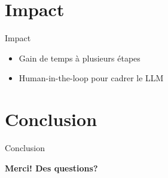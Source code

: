 \documentclass{beamer}
\begin{document}
\section{Impact}
\begin{frame}{Impact}
	\vspace*{-1cm}
	\begin{itemize}
		\item Gain de temps à plusieurs étapes
		\item Human-in-the-loop pour cadrer le LLM
	\end{itemize}
\end{frame}

\section{Conclusion}
\begin{frame}{Conclusion}
	\begin{center}
	\textbf{Merci! Des questions?}
	\end{center}
\end{frame}
\end{document}
